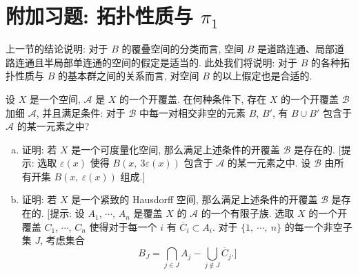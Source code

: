 \section*{附加习题: 拓扑性质与 $\pi_{1}$}
\label{ch13-extra}

上一节的结论说明: 对于 $B$ 的覆叠空间的分类而言, 空间 $B$ 是道路连通、局部道路连通且半局部单连通的空间的假定是适当的. 此处我们将说明: 对于 $B$ 的各种拓扑性质与 $B$ 的基本群之间的关系而言, 对空间 $B$ 的以上假定也是合适的.

\begin{exercise}
\label{exercise:ch13-extra-01}
设 $X$ 是一个空间, $\mathcal{A}$ 是 $X$ 的一个开覆盖. 在何种条件下, 存在 $X$ 的一个开覆盖 $\mathcal{B}$ 加细 $\mathcal{A}$, 并且满足条件: 对于 $\mathcal{B}$ 中每一对相交非空的元素 $B$, $B'$, 有 $B\cup B'$ 包含于 $\mathcal{A}$ 的某一元素之中?
\begin{enumerate}[(a)]
\item 证明: 若 $X$ 是一个可度量化空间, 那么满足上述条件的开覆盖 $\mathcal{B}$ 是存在的. [提示: 选取 $\varepsilon(x)$ 使得 $B(x,\ 3\varepsilon(x))$ 包含于 $\mathcal{A}$ 的某一元素之中. 设 $\mathcal{B}$ 由所有开集 $B(x,\ \varepsilon(x))$ 组成.]
\item 证明: 若 $X$ 是一个紧致的 Hausdorff 空间, 那么满足上述条件的开覆盖 $\mathcal{B}$ 是存在的. [提示: 设 $A_{1}$, $\cdots$, $A_{n}$ 是覆盖 $X$ 的 $\mathcal{A}$ 的一个有限子族. 选取 $X$ 的一个开覆盖 $C_{1}$, $\cdots$, $C_{n}$ 使得对于每一个 $i$ 有 $\overline{C}_{i}\subset A_{i}$. 对于 $\{1,\ \cdots,\ n\}$ 的每一个非空子集 $J$, 考虑集合
\[
B_{J}=\bigcap_{j\in J}A_{j}-\bigcup_{j\notin J}\overline{C}_{j}.]
\]
\end{enumerate}
\end{exercise}

